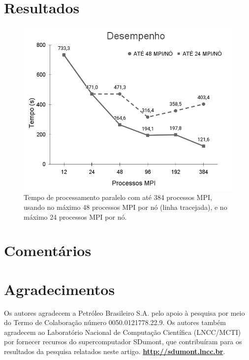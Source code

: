 \documentclass[12pt]{article}
\begin{document}
\section{Resultados}


\begin{figure}[ht]
\centering
\includegraphics[width=.5\textwidth]{figures/perfpernode.png}
\caption{Tempo de processamento paralelo com até 384 processos MPI, usando no máximo 48 processos MPI por nó (linha tracejada), e no máximo 24 processos MPI por nó.}
\label{fig:perfpernode}
\end{figure}


\section{Comentários}


\section*{Agradecimentos}
Os autores agradecem a Petróleo Brasileiro S.A. pelo apoio à pesquisa por meio do Termo de Colaboração número 0050.0121778.22.9. Os autores também agradecem ao Laboratório Nacional de Computação Científica (LNCC/MCTI) por fornecer recursos do supercomputador SDumont, que contribuíram para os resultados da pesquisa relatados neste artigo. \textbf{\url{http://sdumont.lncc.br}}.



\end{document}
